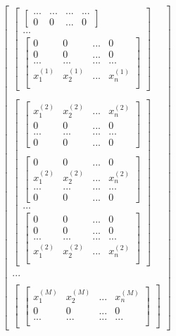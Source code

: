 \documentclass[UTF8]{article}
\begin{document}
\begin{equation}
\begin{aligned}
\begin{bmatrix}
\begin{bmatrix}
\begin{bmatrix}
 ... & ... & ... & ... \\
 0 & 0 & ... & 0
 \end{bmatrix} \\
 ... \\
 \begin{bmatrix}
 0 & 0 & ... & 0 \\
 0 & 0 & ... & 0 \\
 ... & ... & ... & ... \\
 x_{1}^{(1)} & x_{2}^{(1)} & ... & x_{n}^{(1)} \\
 \end{bmatrix}
 \end{bmatrix} \\ \\
\begin{bmatrix}
 \begin{bmatrix}
 x_{1}^{(2)} & x_{2}^{(2)} & ... & x_{n}^{(2)} \\
 0 & 0 & ... &　0 \\
 ... & ... & ... & ... \\
 0 & 0 & ... & 0
 \end{bmatrix} \\ \\
 \begin{bmatrix}
 0 & 0 & ... & 0 \\
 x_{1}^{(2)} & x_{2}^{(2)} & ... & x_{n}^{(2)} \\
 ... & ... & ... & ... \\
 0 & 0 & ... & 0
 \end{bmatrix} \\
 ... \\
 \begin{bmatrix}
 0 & 0 & ... & 0 \\
 0 & 0 & ... & 0 \\
 ... & ... & ... & ... \\
 x_{1}^{(2)} & x_{2}^{(2)} & ... & x_{n}^{(2)} \\
 \end{bmatrix}
 \end{bmatrix} \\ \\
  ... \\ \\
\begin{bmatrix}
 \begin{bmatrix}
 x_{1}^{(M)} & x_{2}^{(M)} & ... & x_{n}^{(M)} \\
 0 & 0 & ... &　0 \\
 ... & ... & ... & ... \\

\end{bmatrix}
\end{bmatrix}
\end{bmatrix}
\end{aligned}
\end{equation}
\end{document}
